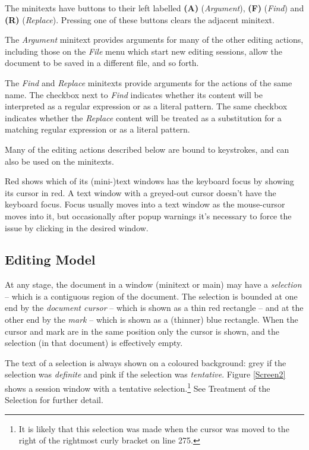 \documentclass[11pt,a4paper]{article}
\begin{document}
The minitexts have buttons to their left labelled \textbf{(A)}
(\emph{Argument}), \textbf{(F)} (\emph{Find}) and \textbf{(R)}
(\emph{Replace}). Pressing one of these buttons clears the adjacent
minitext.


The \emph{Argument} minitext provides arguments for many of the other
editing actions, including those on the \emph{File} menu which start new
editing sessions, allow the document to be saved in a different file,
and so forth.

The \emph{Find} and \emph{Replace} minitexts provide arguments for the
actions of the same name. The checkbox next to \emph{Find} indicates
whether its content will be interpreted as a regular expression or as a
literal pattern. The same checkbox indicates whether the \emph{Replace}
content will be treated as a substitution for a matching regular
expression or as a literal pattern.

Many of the editing actions described below are bound to keystrokes, and
can also be used on the minitexts.

Red shows which of its (mini-)text windows has the keyboard focus by
showing its cursor in red. A text window with a greyed-out cursor
doesn't have the keyboard focus. Focus usually moves into a text window
as the mouse-cursor moves into it, but occasionally after popup warnings
it's necessary to force the issue by clicking in the desired window.

\hypertarget{editingmodel}{\subsection{Editing Model}\label{theediting-model}}



At any stage, the document in a window (minitext or main) may have a
\emph{selection} -- which is a contiguous region of the document. The
selection is bounded at one end by the \emph{document cursor} -- which
is shown as a thin red rectangle -- and at the other end by the
\emph{mark} -- which is shown as a (thinner) blue rectangle. When the
cursor and mark are in the same position only the cursor is shown, and
the selection (in that document) is effectively empty.

The text of a selection is always shown on a coloured background: grey
if the selection was \emph{definite} and pink if the selection was
\emph{tentative}. Figure \ref{Screen2} shows a session
window with a tentative selection.\footnote{It is likely that
this selection was made when the cursor was moved
to the right of the rightmost curly bracket on
line 275.} See \textsf{Treatment of the Selection} for further
detail.
\end{document}
